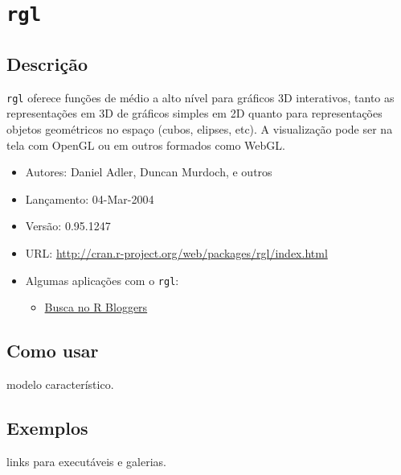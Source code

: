 \section{\texttt{rgl}}

\subsection{Descrição}


\begin{frame}

  \texttt{rgl} oferece funções de médio a alto nível para gráficos 3D
  interativos, tanto as representações em 3D de gráficos simples em 2D
  quanto para representações objetos geométricos no espaço (cubos,
  elipses, etc). A visualização pode ser na tela com OpenGL ou em outros
  formados como WebGL.

  \begin{itemize}
  \item Autores: Daniel Adler, Duncan Murdoch, e outros
  \item Lançamento: 04-Mar-2004
  \item Versão: 0.95.1247
  \item URL: \url{http://cran.r-project.org/web/packages/rgl/index.html}
  \item Algumas aplicações com o \texttt{rgl}:

  \begin{itemize}
    \itemsep1pt\parskip0pt
  \item \href{http://www.r-bloggers.com/?s=rgl}{Busca no R Bloggers}
  \end{itemize}
\end{itemize}

\end{frame}


\subsection{Como usar}

\begin{frame}

  modelo característico.

\end{frame}


\subsection{Exemplos}

\begin{frame}

  links para executáveis e galerias.

\end{frame}